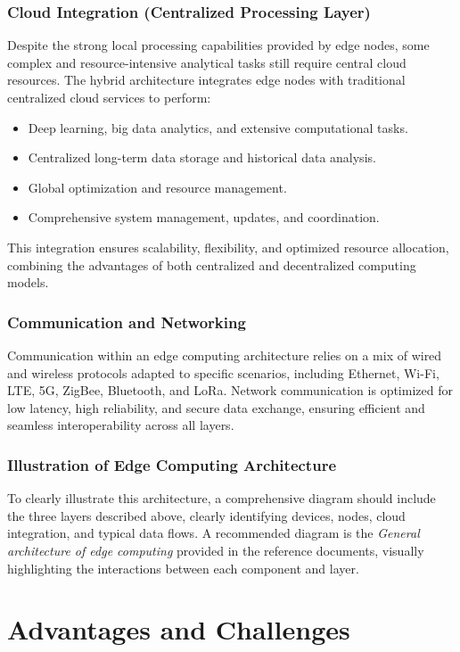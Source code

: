 \documentclass[runningheads]{llncs}
\begin{document}
\subsubsection{Cloud Integration (Centralized Processing Layer)}
Despite the strong local processing capabilities provided by edge nodes, some complex and resource-intensive analytical tasks still require central cloud resources. The hybrid architecture integrates edge nodes with traditional centralized cloud services to perform:
\begin{itemize}
    \item Deep learning, big data analytics, and extensive computational tasks.
    \item Centralized long-term data storage and historical data analysis.
    \item Global optimization and resource management.
    \item Comprehensive system management, updates, and coordination.
\end{itemize}

This integration ensures scalability, flexibility, and optimized resource allocation, combining the advantages of both centralized and decentralized computing models.

\subsubsection{Communication and Networking}
Communication within an edge computing architecture relies on a mix of wired and wireless protocols adapted to specific scenarios, including Ethernet, Wi-Fi, LTE, 5G, ZigBee, Bluetooth, and LoRa. Network communication is optimized for low latency, high reliability, and secure data exchange, ensuring efficient and seamless interoperability across all layers.

\subsubsection{Illustration of Edge Computing Architecture}
To clearly illustrate this architecture, a comprehensive diagram should include the three layers described above, clearly identifying devices, nodes, cloud integration, and typical data flows. A recommended diagram is the \textit{General architecture of edge computing} provided in the reference documents, visually highlighting the interactions between each component and layer.


\section{Advantages and Challenges}
\end{document}
